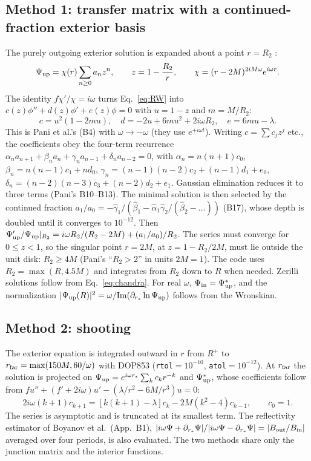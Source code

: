 \documentclass[11pt,a4paper]{article}
\numberwithin{equation}{section}
\begin{document}
\subsection{Method 1: transfer matrix with a continued-fraction exterior basis}
The purely outgoing exterior solution is expanded about a point $r=R_2$ \cite{LNS93,Pani09}:
\begin{equation}
\Psi_{\rm up}=\chi(r)\sum_{n\ge0}a_nz^n,\qquad z=1-\frac{R_2}{r},\qquad \chi=(r-2M)^{2iM\omega}e^{i\omega r}.
\end{equation}
The identity $f\chi'/\chi=i\omega$ turns Eq.~\eqref{eq:RW} into $c(z)\phi''+d(z)\phi'+e(z)\phi=0$ with $u=1-z$ and
$m=M/R_2$:
\begin{equation}
c=u^2(1-2mu),\quad d=-2u+6mu^2+2i\omega R_2,\quad e=6mu-\lambda .
\end{equation}
This is Pani et al.'s (B4) with $\omega\to-\omega$ (they use $e^{+i\omega t}$). Writing $c=\sum c_jz^j$ etc., the
coefficients obey the four-term recurrence
$\alpha_na_{n+1}+\beta_na_n+\gamma_na_{n-1}+\delta_na_{n-2}=0$, with $\alpha_n=n(n+1)c_0$,
$\beta_n=n(n-1)c_1+nd_0$, $\gamma_n=(n-1)(n-2)c_2+(n-1)d_1+e_0$, $\delta_n=(n-2)(n-3)c_3+(n-2)d_2+e_1$. Gaussian
elimination reduces it to three terms \cite{Leaver90} (Pani's B10--B13). The minimal solution \cite{Gautschi67} is
then selected by the continued fraction
$a_1/a_0=-\hat\gamma_1/(\hat\beta_1-\hat\alpha_1\hat\gamma_2/(\hat\beta_2-\dots))$ (B17), whose depth is doubled until it
converges to $10^{-12}$. Then $\Psi_{\rm up}'/\Psi_{\rm up}|_{R_2}=i\omega R_2/(R_2-2M)+(a_1/a_0)/R_2$. The series must
converge for $0\le z<1$, so the singular point $r=2M$, at $z=1-R_2/2M$, must lie outside the unit disk: $R_2\ge4M$
(Pani's ``$R_2>2$'' in units $2M=1$). The code uses $R_2=\max(R,4.5M)$ and integrates from $R_2$ down to $R$ when
needed. Zerilli solutions follow from Eq.~\eqref{eq:chandra}. For real $\omega$, $\Psi_{\rm in}=\Psi_{\rm up}^*$, and the
normalization $|\Psi_{\rm up}(R)|^2=\omega/{\rm Im}(\partial_{r_*}\ln\Psi_{\rm up})$ follows from the Wronskian.

\subsection{Method 2: shooting}
The exterior equation is integrated outward in $r$ from $R^+$ to $r_{\rm far}=\max(150M,60/\omega)$ with DOP853
\cite{Hairer93,SciPy20} (\texttt{rtol}$=10^{-10}$, \texttt{atol}$=10^{-12}$). At $r_{\rm far}$ the solution is projected on
$\Psi_{\rm up}=e^{i\omega r_*}\sum_kc_kr^{-k}$ and $\Psi_{\rm up}^*$, whose coefficients follow from
$fu''+(f'+2i\omega)u'-(\lambda/r^2-6M/r^3)u=0$:
\begin{equation}
2i\omega(k+1)c_{k+1}=[k(k+1)-\lambda]c_k-2M(k^2-4)c_{k-1},\qquad c_0=1 .
\label{eq:asym}
\end{equation}
The series is asymptotic and is truncated at its smallest term. The reflectivity estimator of Boyanov et al.\
(App.~B1), $|i\omega\Psi+\partial_{r_*}\Psi|/|i\omega\Psi-\partial_{r_*}\Psi|=|B_{\rm out}/B_{\rm in}|$ averaged over four
periods, is also evaluated. The two methods share only the junction matrix and the interior functions.
\end{document}
